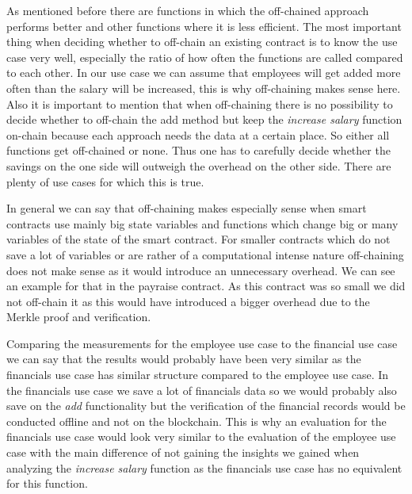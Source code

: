 As mentioned before there are functions in which the off-chained approach performs better and other functions where it is less efficient. The most important thing when deciding whether to off-chain an existing contract is to know the use case very well, especially the ratio of how often the functions are called compared to each other. In our use case we can assume that employees will get added more often than the salary will be increased, this is why off-chaining makes sense here. Also it is important to mention that when off-chaining there is no possibility to decide whether to off-chain the add method but keep the \textit{increase salary} function on-chain because each approach needs the data at a certain place. So either all functions get off-chained or none. Thus one has to carefully decide whether the savings on the one side will outweigh the overhead on the other side. There are plenty of use cases for which this is true.

In general we can say that off-chaining makes especially sense when smart contracts use mainly big state variables and functions which change big or many variables of the state of the smart contract. For smaller contracts which do not save a lot of variables or are rather of a computational intense nature off-chaining does not make sense as it would introduce an unnecessary overhead. We can see an example for that in the payraise contract. As this contract was so small we did not off-chain it as this would have introduced a bigger overhead due to the Merkle proof and verification.

Comparing the measurements for the employee use case to the financial use case we can say that the results would probably have been very similar as the financials use case has similar structure compared to the employee use case. In the financials use case we save a lot of financials data so we would probably also save on the \textit{add} functionality but the verification of the financial records would be conducted offline and not on the blockchain. This is why an evaluation for the financials use case would look very similar to the evaluation of the employee use case with the main difference of not gaining the insights we gained when analyzing the \textit{increase salary} function as the financials use case has no equivalent for this function.

